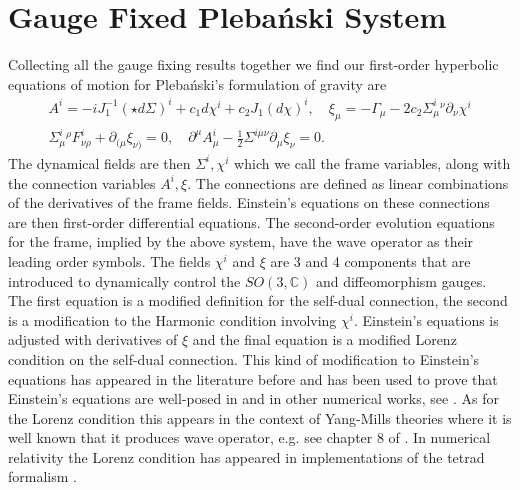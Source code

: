 \documentclass[10pt]{report}
\newcommand{\pleb}[0]{Pleba\'nski}
\theoremstyle{definition}
\newcommand{\C}[0]{\mathbb{C}}
\begin{document}
        \section{Gauge Fixed \pleb{} System} \label{sec:nonlin-pleb-gauge-fixed-system}
        Collecting all the gauge fixing results together we find our first-order hyperbolic equations of motion for \pleb{}'s formulation of gravity are
        \begin{gather}
            A^i = -i J_1^{-1}(\star d\Sigma)^i + c_1 d\chi^i + c_2 J_1(d\chi)^i, \quad \xi_\mu = - \Gamma_\mu - 2c_2 \Sigma^i_\mu{}^\nu \partial_\nu \chi^i \label{eq:nonlinear-modified-connection-definitions}\\
            \Sigma^i_\mu{}^\rho F^i_{\nu\rho} + \partial_{(\mu} \xi_{\nu)} = 0, \quad \partial^\mu A^i_\mu - \frac{1}{2} \Sigma^{i\mu\nu} \partial_\mu \xi_\nu = 0 \label{eq:nonlinear-modified-einstein-and-lorenz-conditions}.
        \end{gather}
        The dynamical fields are then $\Sigma^i, \chi^i$ which we call the frame variables, along with the connection variables $A^i, \xi$. The connections are defined as linear combinations of the derivatives of the frame fields. Einstein's equations on these connections are then first-order differential equations. The second-order evolution equations for the frame, implied by the above system, have the wave operator as their leading order symbols. The fields $\chi^i$ and $\xi$ are 3 and 4 components that are introduced to dynamically control the $SO(3,\C)$ and diffeomorphism gauges. The first equation is a modified definition for the self-dual connection, the second is a modification to the Harmonic condition involving $\chi^i$. Einstein's equations is adjusted with derivatives of $\xi$ and the final equation is a modified Lorenz condition on the self-dual connection. This kind of modification to Einstein's equations has appeared in the literature before and has been used to prove that Einstein's equations are well-posed in \cite{Theoreme_d_exis_Foures_1952,Existence_of_me_DeTurc_1981} and in other numerical works, see \cite{General_covaria_Bona_2003,A_new_approach_Headri_2009}. As for the Lorenz condition this appears in the context of Yang-Mills theories where it is well known that it produces wave operator, e.g. see chapter 8 of \cite{FormGenRelGravity2020}. In numerical relativity the Lorenz condition has appeared in implementations of the tetrad formalism \cite{HyperbolicTetrBuchma2003}.
        
\end{document}
